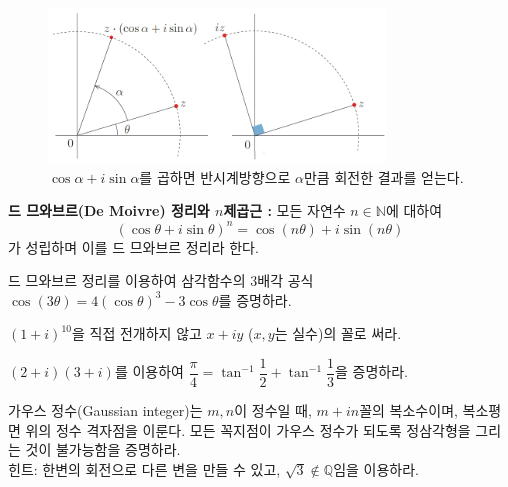 \begin{figure}[!h]
\begin{center}
\includegraphics[width=0.8\textwidth]{./SaltChapter/figs/fig-1-6}
\end{center}
\caption{$\cos\alpha + i \sin\alpha$를 곱하면 반시계방향으로 $\alpha$만큼 회전한 결과를 얻는다.}
\label{fig-1-6}
\end{figure}

{\bf 드 므와브르(De Moivre) 정리와 $n$제곱근 :}
모든 자연수 $n\in\mathbb N$에 대하여
$$
(\cos\theta + i\sin\theta)^n = \cos(n\theta) + i\sin(n\theta)
$$
가 성립하며 이를 드 므와브르 정리라 한다.

\begin{salt_exercise} \label{ex-1-5}
드 므와브르 정리를 이용하여
삼각함수의 3배각 공식 $\cos (3\theta) = 4(\cos\theta)^3 - 3\cos\theta$를 증명하라.
\end{salt_exercise}

\begin{salt_exercise} \label{ex-1-6}
$(1+i)^{10}$을 직접 전개하지 않고 $x+iy$ ($x,y$는 실수)의 꼴로 써라.
\end{salt_exercise}

\begin{salt_exercise} \label{ex-1-7}
$(2+i)(3+i)$를 이용하여
$\dfrac\pi4 = \tan^{-1}\dfrac12 + \tan^{-1}\dfrac13$을 증명하라.
\end{salt_exercise}

\begin{salt_exercise} \label{ex-1-8}
가우스 정수(Gaussian integer)는 
$m, n$이 정수일 때, $m+in$꼴의 복소수이며,
복소평면 위의 정수 격자점을 이룬다.
모든 꼭지점이 가우스 정수가 되도록 정삼각형을 그리는 것이 불가능함을 증명하라. \\[1ex]
힌트: 한변의 회전으로 다른 변을 만들 수 있고, $\sqrt{3}\not\in \mathbb Q$임을 이용하라.
\end{salt_exercise}

